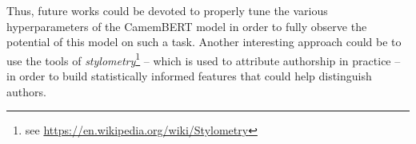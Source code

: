 \documentclass[11pt,a4paper]{article}
\begin{document}
Thus, future works could be devoted to properly tune the various hyperparameters of the CamemBERT model in order to fully observe the potential of this model on such a task. Another interesting approach could be to use the tools of \textit{stylometry}\footnote{see \url{https://en.wikipedia.org/wiki/Stylometry}} -- which is used to attribute authorship in practice -- in order to build statistically informed features that could help distinguish authors.







\newpage



\end{document}
